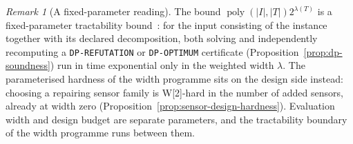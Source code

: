 \documentclass[11pt]{article}
\theoremstyle{plain}
\theoremstyle{definition}
\theoremstyle{remark}
\newtheorem{remark}[theorem]{Remark}
\begin{document}
\begin{remark}[A fixed-parameter reading]
\label{rem:fpt-reading}
The bound \(\operatorname{poly}(|I|,|T|)2^{\lambda(T)}\) is a fixed-parameter
tractability bound~\cite{downey-fellows99}: for the input consisting of the
instance together with its declared decomposition, both solving and
independently recomputing a \texttt{DP-REFUTATION} or \texttt{DP-OPTIMUM}
certificate (Proposition~\ref{prop:dp-soundness}) run in time exponential
only in the weighted width \(\lambda\).  The parameterised hardness of the
width programme sits on the design side instead: choosing a repairing sensor
family is W[2]-hard in the number of added sensors, already at width zero
(Proposition~\ref{prop:sensor-design-hardness}).  Evaluation width and design
budget are separate parameters, and the tractability boundary of the width
programme runs between them.
\end{remark}
\end{document}
